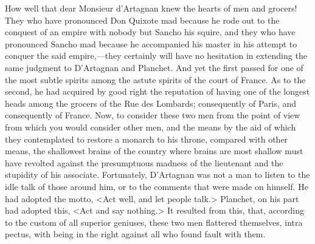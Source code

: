 How well that dear Monsieur d'Artagnan knew the hearts of men and grocers! They who have pronounced Don Quixote mad because he rode out to the conquest of an empire with nobody but Sancho his squire, and they who have pronounced Sancho mad because he accompanied his master in his attempt to conquer the said empire,—they certainly will have no hesitation in extending the same judgment to D'Artagnan and Planchet. And yet the first passed for one of the most subtle spirits among the astute spirits of the court of France. As to the second, he had acquired by good right the reputation of having one of the longest heads among the grocers of the Rue des Lombards; consequently of Paris, and consequently of France. Now, to consider these two men from the point of view from which you would consider other men, and the means by the aid of which they contemplated to restore a monarch to his throne, compared with other means, the shallowest brains of the country where brains are most shallow must have revolted against the presumptuous madness of the lieutenant and the stupidity of his associate. Fortunately, D'Artagnan was not a man to listen to the idle talk of those around him, or to the comments that were made on himself. He had adopted the motto, <Act well, and let people talk.> Planchet, on his part had adopted this, <Act and say nothing.> It resulted from this, that, according to the custom of all superior geniuses, these two men flattered themselves, intra pectus, with being in the right against all who found fault with them.

